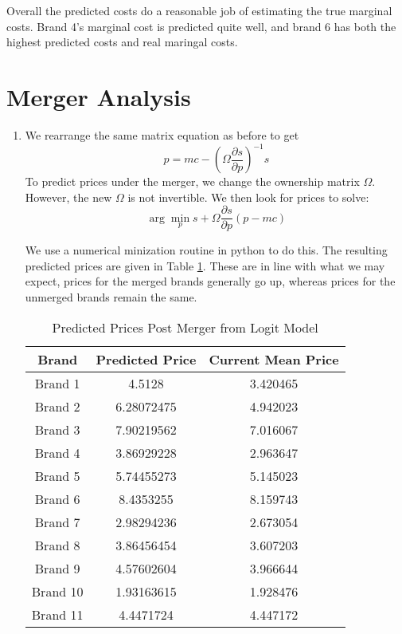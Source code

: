 \documentclass[10pt]{article}
\begin{document}
\begin{enumerate}
Overall the predicted costs do a reasonable job of estimating the true marginal costs. Brand 4's marginal cost is predicted quite well, and brand 6 has both the highest predicted costs and real maringal costs.

\end{enumerate}

\section{Merger Analysis}

\begin{enumerate}
  \item We rearrange the same matrix equation as before to get
 $$p = mc - \left(\Omega\frac{\partial s}{\partial p}\right)^{-1}s $$
  To predict prices under the merger, we change the ownership matrix $\Omega$. However, the new $\Omega$ is not invertible. We then look for prices to solve:
  $$\arg\min_p s + \Omega\frac{\partial s}{\partial p}(p - mc)$$

  We use a numerical minization routine in python to do this. The resulting predicted prices are given in Table \ref{logPred}.  These are in line with what we may expect, prices for the merged brands generally go up, whereas prices for the unmerged brands remain the same.

  \begin{center}
  \begin{table}[!htb]
  \centering
  \begin{tabular}{c|c c}
    \hline
    Brand & Predicted Price & Current Mean Price \\
    \hline
    Brand 1 & 4.5128 & 3.420465  \\
    Brand 2 & 6.28072475 & 4.942023 \\
    Brand 3 & 7.90219562 & 7.016067\\
    Brand 4 & 3.86929228 & 2.963647 \\
    Brand 5 & 5.74455273 & 5.145023\\
    Brand 6 & 8.4353255  & 8.159743\\
    Brand 7 & 2.98294236 & 2.673054 \\
    Brand 8 & 3.86456454 & 3.607203 \\
    Brand 9 & 4.57602604 & 3.966644\\
    Brand 10 & 1.93163615  & 1.928476\\
    Brand 11 &4.4471724 & 4.447172 \\
    \hline
  \end{tabular}
  \caption{Predicted Prices Post Merger from Logit Model}
  \label{logPred}
\end{table}
  \end{center}




\end{enumerate}
\end{document}
